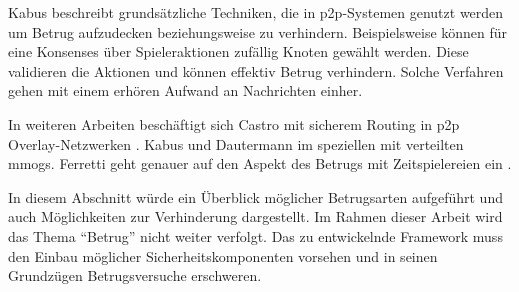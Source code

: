 Kabus \cite{Kabus2007Design, Kabus2009} beschreibt grundsätzliche Techniken, die in p2p-Systemen genutzt werden um Betrug aufzudecken beziehungsweise zu verhindern. Beispielsweise können für eine Konsenses über Spieleraktionen zufällig Knoten gewählt werden. Diese validieren die Aktionen und können effektiv Betrug verhindern. Solche Verfahren gehen mit einem erhören Aufwand an Nachrichten einher.

In weiteren Arbeiten beschäftigt sich Castro mit sicherem Routing in p2p Overlay-Netzwerken \cite{Castro2002Secure}. Kabus \cite{Kabus2005Addressing} und Dautermann \cite{Dautermann2007} im speziellen mit verteilten \acp{mmog}. Ferretti geht genauer auf den Aspekt des Betrugs mit Zeitspielereien ein \cite{Ferretti2008Cheating}.

In diesem Abschnitt würde ein Überblick möglicher Betrugsarten aufgeführt und auch Möglichkeiten zur Verhinderung dargestellt.
Im Rahmen dieser Arbeit wird das Thema ``Betrug'' nicht weiter verfolgt. Das zu entwickelnde Framework muss den Einbau möglicher Sicherheitskomponenten vorsehen und in seinen Grundzügen Betrugsversuche erschweren.
